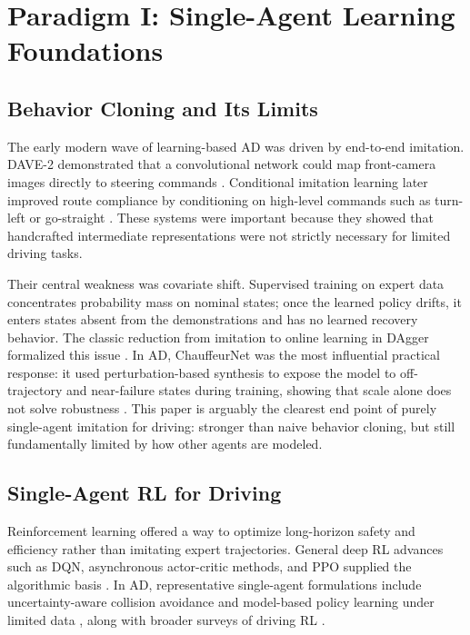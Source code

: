 \documentclass[12pt, a4paper]{article}
\begin{document}
\section{Paradigm I: Single-Agent Learning Foundations}
\label{sec:paradigm1}

\subsection{Behavior Cloning and Its Limits}

The early modern wave of learning-based AD was driven by end-to-end imitation.
DAVE-2 demonstrated that a convolutional network could map front-camera images
directly to steering commands \cite{bojarski2016end}. Conditional imitation
learning later improved route compliance by conditioning on high-level commands
such as turn-left or go-straight \cite{codevilla2018end}. These systems were
important because they showed that handcrafted intermediate representations were
not strictly necessary for limited driving tasks.

Their central weakness was covariate shift. Supervised training on expert data
concentrates probability mass on nominal states; once the learned policy drifts,
it enters states absent from the demonstrations and has no learned recovery
behavior. The classic reduction from imitation to online learning in DAgger
formalized this issue \cite{ross2011reduction}. In AD, ChauffeurNet was the most
influential practical response: it used perturbation-based synthesis to expose
the model to off-trajectory and near-failure states during training, showing that
scale alone does not solve robustness \cite{bansal2018chauffeur}. This paper is
arguably the clearest end point of purely single-agent imitation for driving:
stronger than naive behavior cloning, but still fundamentally limited by how
other agents are modeled.

\subsection{Single-Agent RL for Driving}

Reinforcement learning offered a way to optimize long-horizon safety and
efficiency rather than imitating expert trajectories. General deep RL advances
such as DQN, asynchronous actor-critic methods, and PPO supplied the algorithmic
basis \cite{mnih2015human,mnih2016asynchronous,schulman2017proximal}. In AD,
representative single-agent formulations include uncertainty-aware collision
avoidance and model-based policy learning under limited data
\cite{kahn2017uncertainty,chen2019model}, along with broader surveys of driving
RL \cite{sallab2017deep,kiran2021deep}.
\end{document}
